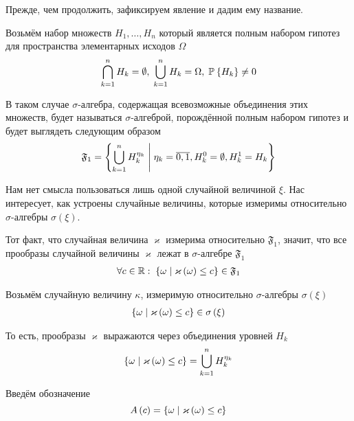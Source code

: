 Прежде, чем продолжить, зафиксируем явление и дадим ему название.

\begin{definition}
  Возьмём набор множеств $H_1, \dots, H_n$ который является полным набором
  гипотез для пространства элементарных исходов $\Omega$
  $$\bigcap_{k=1}^n H_k = \emptyset,\; \bigcup_{k=1}^n H_k = \Omega,\;
      \mathbb{P}_{{}}\left\{ H_k \right\} \neq 0$$

  В таком случае $\sigma$-алгебра, содержащая всевозможные объединения этих
  множеств, будет называться $\sigma$-алгеброй, порождённой полным набором
  гипотез и будет выглядеть следующим образом
  $$\mathfrak{F}_1 = \left\{ \bigcup_{k=1}^n H_k^{\eta_k}
      \;\middle|\; \eta_k = \overline{0,1},
      H_k^0 = \emptyset, H_k^1 = H_k \right\}$$
\end{definition}

Нам нет смысла пользоваться лишь одной случайной величиной $\xi$.
Нас интересует, как устроены случайные величины,
которые измеримы относительно $\sigma$-алгебры $\sigma\left( \xi \right)$.

\begin{definition}
  Тот факт, что случайная величина $\varkappa$ измерима относительно
  $\mathfrak{F}_1$, значит, что все прообразы случайной величины
  $\varkappa$ лежат в $\sigma$-алгебре $\mathfrak{F}_1$
  \begin{align*}
      \forall c \in \mathbb{R}:\;
      \left\{ \omega \;\middle|\; \varkappa\left( \omega \right) \le c \right\}
      \in \mathfrak{F}_1
  \end{align*}
\end{definition}

Возьмём случайную величину $\kappa$, измеримую относительно $\sigma$-алгебры
$\sigma\left( \xi \right)$
\begin{align*}
  \left\{ \omega \;\middle|\; \varkappa\left( \omega \right) \le c \right\}
      \in \sigma\left( \xi \right)
\end{align*}

То есть, прообразы $\varkappa$ выражаются через объединения уровней $H_k$
$$\left\{ \omega \;\middle|\; \varkappa\left( \omega \right) \le c \right\}
  = \bigcup_{k=1}^n H_k^{\eta_k}$$

Введём обозначение
$$A\left( c \right)
  = \left\{ \omega \;\middle|\; \varkappa\left( \omega \right) \le c \right\}$$

